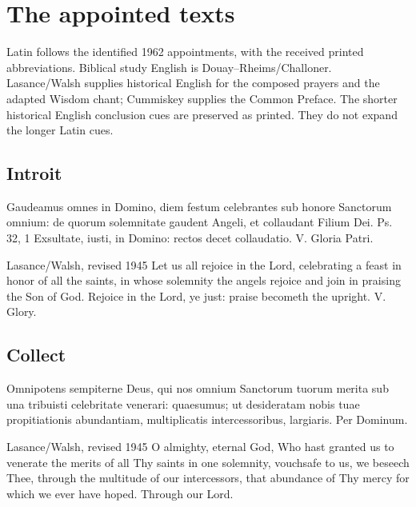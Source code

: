 \section{The appointed texts}
Latin follows the identified 1962 appointments, with the received printed
abbreviations. Biblical study English is Douay--Rheims/Challoner.
Lasance/Walsh supplies historical English for the composed prayers and
the adapted Wisdom chant; Cummiskey supplies the Common Preface.
The shorter historical English conclusion cues are preserved as printed.
They do not expand the longer Latin cues.

\subsection{Introit}
\label{proper-introit}
\begin{latinproper}
Gaudeamus omnes in Domino, diem festum celebrantes sub honore Sanctorum omnium: de quorum solemnitate gaudent Angeli, et collaudant Filium Dei. Ps. 32, 1 Exsultate, iusti, in Domino: rectos decet collaudatio. V. Gloria Patri.
\end{latinproper}
\begin{englishwitness}{Lasance/Walsh, revised 1945}
Let us all rejoice in the Lord, celebrating a feast in honor of all the saints, in whose solemnity the angels rejoice and join in praising the Son of God. Rejoice in the Lord, ye just: praise becometh the upright. V. Glory.
\end{englishwitness}

\subsection{Collect}
\label{proper-collect}
\begin{latinproper}
Omnipotens sempiterne Deus, qui nos omnium Sanctorum tuorum merita sub una tribuisti celebritate venerari: quaesumus; ut desideratam nobis tuae propitiationis abundantiam, multiplicatis intercessoribus, largiaris. Per Dominum.
\end{latinproper}
\begin{englishwitness}{Lasance/Walsh, revised 1945}
O almighty, eternal God, Who hast granted us to venerate the merits of all Thy saints in one solemnity, vouchsafe to us, we beseech Thee, through the multitude of our intercessors, that abundance of Thy mercy for which we ever have hoped. Through our Lord.
\end{englishwitness}

